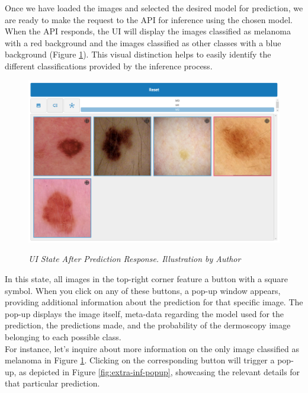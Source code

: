 Once we have loaded the images and selected the desired model for prediction,
we are ready to make the request to the API for inference using the chosen model. When the API responds,
the UI will display the images classified as melanoma with a
red background and the images classified as other classes with a blue background (Figure \ref{fig:after-prediction}).
This visual distinction helps to easily identify the different classifications provided by the inference process.

\begin{figure}[H]
  \centering
  \begin{adjustbox}{width=\textwidth, trim={0cm 3.55cm 0cm 0cm}, clip}
    \includegraphics[width=\textwidth]{imatges/results/after-prediction.png}
  \end{adjustbox}
  \caption[UI State After Prediction Response]{\textit{UI State After Prediction Response. Illustration by Author}}
  {\label{fig:after-prediction}}
\end{figure}

In this state, all images in the top-right corner feature a button with a
square symbol. When you click on any of these buttons, a pop-up window appears,
providing additional information about the prediction for that specific image.
The pop-up displays the image itself, meta-data regarding the model used for
the prediction, the predictions made, and the probability of the dermoscopy
image belonging to each possible class. \\

For instance, let's inquire about more information on the only image classified
as melanoma in Figure \ref{fig:after-prediction}. Clicking on the
corresponding button will trigger a pop-up, as depicted in Figure
\ref{fig:extra-inf-popup}, showcasing the relevant details for that particular
prediction.

